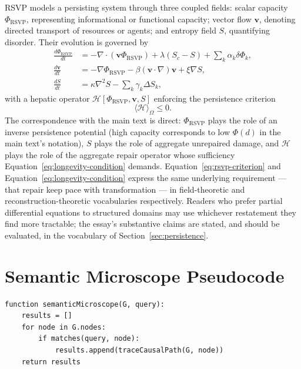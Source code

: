 \documentclass[12pt]{article}
\begin{document}
RSVP models a persisting system through three coupled fields: scalar capacity $\Phi_{\mathrm{RSVP}}$, representing informational or functional capacity; vector flow $\mathbf{v}$, denoting directed transport of resources or agents; and entropy field $S$, quantifying disorder. Their evolution is governed by
\begin{align}
\frac{d\Phi_{\mathrm{RSVP}}}{dt} &= -\nabla \cdot (\mathbf{v}\Phi_{\mathrm{RSVP}}) + \lambda(S_c - S) + \sum_k \alpha_k \delta\Phi_k, \\
\frac{d\mathbf{v}}{dt} &= -\nabla\Phi_{\mathrm{RSVP}} - \beta(\mathbf{v}\cdot\nabla)\mathbf{v} + \xi \nabla S, \\
\frac{dS}{dt} &= \kappa \nabla^2 S - \sum_k \gamma_k \Delta S_k,
\end{align}
with a hepatic operator $\mathcal{H}[\Phi_{\mathrm{RSVP}}, \mathbf{v}, S]$ enforcing the persistence criterion
\begin{equation}
\langle \mathcal{H} \rangle_\Omega \le 0.
\label{eq:rsvp-criterion}
\end{equation}
The correspondence with the main text is direct: $\Phi_{\mathrm{RSVP}}$ plays the role of an inverse persistence potential (high capacity corresponds to low $\Phi(d)$ in the main text's notation), $S$ plays the role of aggregate unrepaired damage, and $\mathcal{H}$ plays the role of the aggregate repair operator whose sufficiency Equation~\eqref{eq:longevity-condition} demands. Equation~\eqref{eq:rsvp-criterion} and Equation~\eqref{eq:longevity-condition} express the same underlying requirement --- that repair keep pace with transformation --- in field-theoretic and reconstruction-theoretic vocabularies respectively. Readers who prefer partial differential equations to structured domains may use whichever restatement they find more tractable; the essay's substantive claims are stated, and should be evaluated, in the vocabulary of Section~\ref{sec:persistence}.

\section{Semantic Microscope Pseudocode}

\begin{lstlisting}[language=JavaScriptRSVP, caption={Semantic microscope query traversal.}, label={lst:semantic-microscope}]
function semanticMicroscope(G, query):
    results = []
    for node in G.nodes:
        if matches(query, node):
            results.append(traceCausalPath(G, node))
    return results
\end{lstlisting}
\end{document}
